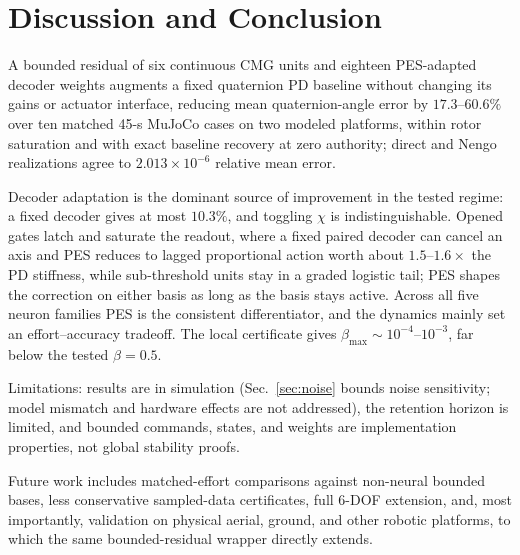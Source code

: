 \documentclass[letterpaper, 10 pt, conference]{ieeeconf}
\begin{document}
\section{Discussion and Conclusion}
\label{sec:conclusion}
A bounded residual of six continuous CMG units and eighteen PES-adapted decoder weights augments a fixed quaternion PD baseline without changing its gains or actuator interface, reducing mean quaternion-angle error by $17.3$--$60.6\%$ over ten matched 45-s MuJoCo cases on two modeled platforms, within rotor saturation and with exact baseline recovery at zero authority; direct and Nengo realizations agree to $2.013\times10^{-6}$ relative mean error.

Decoder adaptation is the dominant source of improvement in the tested regime: a fixed decoder gives at most $10.3\%$, and toggling $\chi$ is indistinguishable. Opened gates latch and saturate the readout, where a fixed paired decoder can cancel an axis and PES reduces to lagged proportional action worth about $1.5$--$1.6\times$ the PD stiffness, while sub-threshold units stay in a graded logistic tail; PES shapes the correction on either basis as long as the basis stays active. Across all five neuron families PES is the consistent differentiator, and the dynamics mainly set an effort--accuracy tradeoff. The local certificate gives $\beta_{\max}\sim10^{-4}$--$10^{-3}$, far below the tested $\beta=0.5$.

Limitations: results are in simulation (Sec.~\ref{sec:noise} bounds noise sensitivity; model mismatch and hardware effects are not addressed), the retention horizon is limited, and bounded commands, states, and weights are implementation properties, not global stability proofs.

Future work includes matched-effort comparisons against non-neural bounded bases, less conservative sampled-data certificates, full 6-DOF extension, and, most importantly, validation on physical aerial, ground, and other robotic platforms, to which the same bounded-residual wrapper directly extends.





\end{document}
